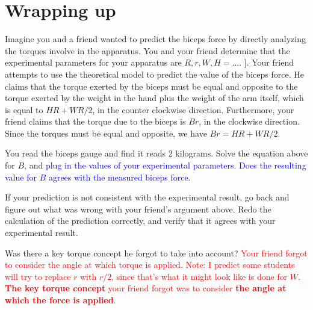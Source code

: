 \documentclass[11pt,letterpaper]{article}
\newcommand{\question}[2][blue]{\textcolor{#1}{#2}}
\newcommand{\answer}[2][red]{\textcolor{#1}{#2}}
\newcommand{\yint}[1][]{vertical intercept\xspace}
\newcommand{\temp}[2][]{#1#2}
\begin{document}
\begin{comment}
You probably noticed some similarities between the previous steps.
Why do they seem so similar?  
Is there a relationship between the model parameters
and the slope and \yint  of your graph?
\answer{Since this is a linear model, the model parameters are precisely
	the slope and the \yint  of the graph.}
\end{comment}


\temp{\pagebreak}
\section*{Wrapping up}
\itemb
	\item 
		Imagine you and a friend wanted to predict the biceps force by 
		directly analyzing the torques involve in the apparatus.
		You and your friend determine that the experimental parameters for
		your apparatus are {$R,r,W,H=...$.  ]}.
		Your friend attempts to use the theoretical model
		to predict the value of the biceps force.
		He claims that the torque exerted by the biceps must be equal and 
		opposite to the torque exerted by the weight in the hand
		plus the weight of the arm itself, 
		which is equal to $H R + W R/2$, in the counter clockwise direction.
		Furthermore, your friend claims that the torque due to
		the biceps is $B r$, in the clockwise direction.
		Since the torques must be equal and opposite, we have
		$Br=HR+WR/2$.

		You read the biceps gauge and find it reads 2 kilograms.
		Solve the equation above for $B$, and 
		\question{plug in the values of your experimental parameters.
		Does the resulting value for $B$ agrees 
		with the measured biceps force.}

		If your prediction is not consistent with the experimental result, 
		go back and figure out what was wrong with your friend's argument
		above.  Redo the calculation of the prediction correctly,
		and verify that it agrees with your experimental result.

		Was there a key torque concept he forgot to take into account?
		\answer{Your friend forgot to consider the angle at which torque is
			applied.  Note:  I predict some students will try to replace $r$
		with $r/2$, since that's what it might look like is done for $W$.
		{\bf The key torque concept} your friend forgot was to consider 
		{\bf the angle at which the force is applied}.  
		}
\end{document}
